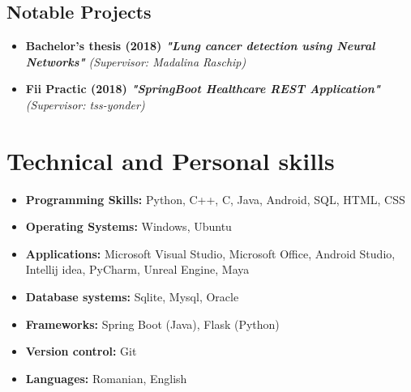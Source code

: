 \documentclass[10pt,a4paper,sans]{moderncv}
\begin{document}
		\vspace{5pt}
		\subsection{Notable Projects}
			
			\begin{itemize}
				\vspace{2pt}
				\item{\textbf{Bachelor's thesis  (2018) \textit{"Lung cancer detection using Neural Networks"} }\textit{(Supervisor: Madalina Raschip) }}
				\small{}
			\end{itemize}

			\begin{itemize}
				\vspace{2pt}
				\item{\textbf{Fii Practic (2018) \textit{"SpringBoot Healthcare REST Application"} }\textit{(Supervisor: tss-yonder)}}
				\small{}
			\end{itemize}
			
	\section{Technical and Personal skills}
		\begin{itemize}

			\vspace{5pt}
			\item \textbf{Programming Skills:}  Python, C++, C, Java, Android, SQL, HTML, CSS
			
			\vspace{2pt}
			\item \textbf{Operating Systems:} Windows, Ubuntu
			
			\vspace{2pt}
			\item \textbf{Applications:} Microsoft Visual Studio, Microsoft Office, Android Studio, Intellij idea, PyCharm, Unreal Engine, Maya
			
			\vspace{2pt}
			\item \textbf{Database systems:} Sqlite, Mysql, Oracle
			
			\vspace{2pt}
			\item \textbf{Frameworks:} Spring Boot (Java), Flask (Python)

			\vspace{2pt}
			\item \textbf{Version control:} Git
			
			\vspace{2pt}
			\item \textbf{Languages:} Romanian, English
			
		\end{itemize}
	
\end{document}
